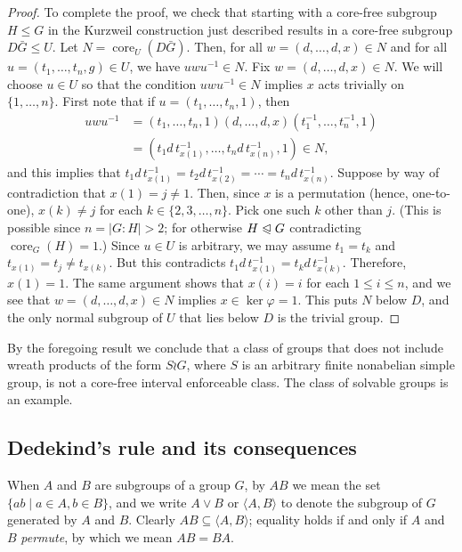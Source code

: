 \documentclass{gen-j-l}
\newcommand{\<}{\ensuremath{\langle}}
\renewcommand{\>}{\ensuremath{\rangle}}
\theoremstyle{plain}
\theoremstyle{definition}
\theoremstyle{remark}
\numberwithin{theorem}{section}
\numberwithin{claim}{section}
\numberwithin{equation}{section}
\numberwithin{conjecture}{section}
\renewcommand{\leq}{\ensuremath{\leqslant}}
\newcommand{\subnormal}{\ensuremath{\trianglelefteqslant}}
\newcommand{\join}{\ensuremath{\vee}}
\newcommand{\core}{\ensuremath{\operatorname{core}}}
\newcommand{\2}{\ensuremath{\mathbf{2}}}
\newcommand{\3}{\ensuremath{\mathbf{3}}}
\renewcommand{\phi}{\ensuremath{\varphi}}
\begin{document}
\begin{proof}
  To complete the proof, we check that starting with a core-free subgroup
  $H \leq G$ in the Kurzweil construction just described results in a
  core-free subgroup $D \bar{G} \leq U$.   Let $N = \core_U(D\bar{G})$.  Then, for all $w=(d,\dots, d, x) \in N$ and for all 
  $u = (t_1,\dots, t_n, g)\in U$, we have $u w u^{-1}\in N$. 
  Fix $w=(d,\dots, d, x) \in N$.  We will choose $u\in U$ so that
  the condition $u w u^{-1}\in N$ implies $x$ acts trivially on $\{1, \dots, n\}$.
  First note that if $u = (t_1,\dots, t_n, 1)$, then
  \begin{align*}
  u w u^{-1} &= (t_1,\dots, t_n, 1) (d, \dots, d, x) (t_1^{-1},\dots, t_n^{-1}, 1)\\
  &=(t_1 d \,t_{x(1)}^{-1},\dots, t_nd \,t_{x(n)}^{-1}, 1) \in N,
  \end{align*}
  and this implies that $t_1 d\, t_{x(1)}^{-1} = t_2 d\, t_{x(2)}^{-1} =\cdots = t_nd \,t_{x(n)}^{-1}$. 
  Suppose by way of contradiction that $x(1) = j\neq 1$.  Then, since $x$ is a
  permutation (hence, one-to-one), $x(k) \neq j$ for
  each $k\in \{2, 3, \dots, n\}$.  Pick one such $k$ other than $j$.
  (This is possible since $n = |G:H|>2$; for otherwise $H\subnormal G$
  contradicting $\core_G(H)=1$.) 
  Since $u \in U$ is arbitrary, we may assume
  $t_1 = t_k$ and $t_{x(1)}=t_j\neq t_{x(k)}$.  
  But this contradicts $t_1 d\, t_{x(1)}^{-1} = t_k d\, t_{x(k)}^{-1}$.
  Therefore, $x(1) = 1$.  The same argument shows that 
  $x(i) = i$ for each $1\leq i\leq n$, 
  and we see that
  $w=(d,\dots,d, x) \in N$ implies $x\in \ker \phi = 1$.  This puts $N$ below
  $D$, and the only normal subgroup of $U$ that lies 
  below $D$ is the trivial group.
\end{proof}
By the foregoing result we conclude that a class of groups that does
not include wreath products of the form $S\wr G$, where $S$ is an arbitrary
finite nonabelian simple group, is not a core-free interval enforceable class. 
The class of solvable groups is an example.




\subsection{Dedekind's rule and its consequences}
\label{sec:dedekinds-rule}
When $A$ and $B$ are subgroups of a group $G$, by $AB$ we mean the set
$\{ a b \mid a\in A, b\in B\}$, and we write $A \join B$ or $\<A, B\>$ to denote
the subgroup of $G$ generated by $A$ and $B$.  
Clearly $AB \subseteq \<A,B\>$; 
equality holds if and only if $A$ and $B$ \emph{permute}, by which we mean $A B = B A$.
\end{document}
